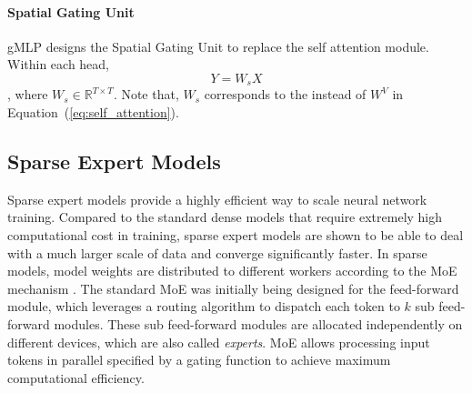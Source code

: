 \documentclass{article}
\begin{document}
\vspace{-2mm}
\paragraph{Spatial Gating Unit}
gMLP \citep{gmlp} designs the Spatial Gating Unit to replace the self attention module. Within each head, 
\begin{equation}
    Y = W_sX
    \label{eq:gmlp}
\end{equation}
, where $W_s \in \mathbb{R}^{T \times T}$. Note that, $W_s$ corresponds to the  instead of $W^V$ in Equation~(\ref{eq:self_attention}). 




\subsection{Sparse Expert Models}
\label{sec:backgroud_moe}



Sparse expert models provide a highly efficient way to scale neural network training. Compared to the standard dense models that require extremely high computational cost in training, sparse expert models are shown to be able to deal with a much larger scale of data and converge significantly faster. In sparse models, model weights are distributed to different workers according to the MoE mechanism \citep{gshard,switch,baselayer,hashlayer,alibaba}.
The standard MoE was initially being designed for the feed-forward module, which leverages a routing algorithm to dispatch each token to $k$ sub feed-forward modules. These sub feed-forward modules are allocated independently on different devices, which are also called {\em experts}. MoE allows processing input tokens in parallel specified by a gating function to achieve maximum computational efficiency. 
\end{document}
